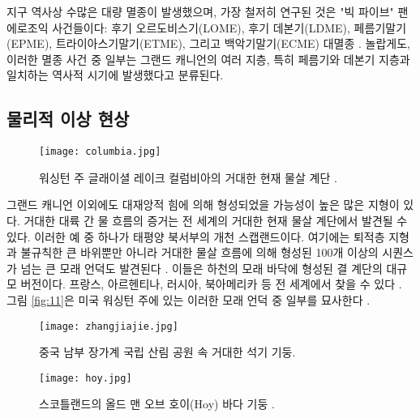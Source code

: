 \documentclass[10pt,twocolumn,letterpaper]{article}
\begin{document}
지구 역사상 수많은 대량 멸종이 발생했으며, 가장 철저히 연구된 것은 "빅 파이브" 팬에로조익 사건들이다: 후기 오르도비스기(LOME), 후기 데본기(LDME), 페름기말기(EPME), 트라이아스기말기(ETME), 그리고 백악기말기(ECME) 대멸종 \cite{88,89}. 놀랍게도, 이러한 멸종 사건 중 일부는 그랜드 캐니언의 여러 지층, 특히 페름기와 데본기 지층과 일치하는 역사적 시기에 발생했다고 분류된다.

\subsection{물리적 이상 현상}

\begin{figure}[t]
\begin{center}
   \texttt{[image: columbia.jpg]}
\end{center}
   \caption{워싱턴 주 글래이셜 레이크 컬럼비아의 거대한 현재 물살 계단 \cite{80}.}
\label{fig:11}
\label{fig:onecol}
\end{figure}

그랜드 캐니언 이외에도 대재앙적 힘에 의해 형성되었을 가능성이 높은 많은 지형이 있다. 거대한 대륙 간 물 흐름의 증거는 전 세계의 거대한 현재 물살 계단에서 발견될 수 있다. 이러한 예 중 하나가 태평양 북서부의 개천 스캡랜드이다. 여기에는 퇴적층 지형과 불규칙한 큰 바위뿐만 아니라 거대한 물살 흐름에 의해 형성된 100개 이상의 시퀀스가 넘는 큰 모래 언덕도 발견된다 \cite{78,79}. 이들은 하천의 모래 바닥에 형성된 결 계단의 대규모 버전이다. 프랑스, 아르헨티나, 러시아, 북아메리카 등 전 세계에서 찾을 수 있다 \cite{81}. 그림 \ref{fig:11}은 미국 워싱턴 주에 있는 이러한 모래 언덕 중 일부를 묘사한다 \cite{80}.

\begin{figure}[t]
\begin{center}
   \texttt{[image: zhangjiajie.jpg]}
\end{center}
   \caption{중국 남부 장가계 국립 산림 공원 속 거대한 석기 기둥.}
\label{fig:12}
\label{fig:onecol}
\end{figure}

\begin{figure}[t]
\begin{center}
   \texttt{[image: hoy.jpg]}
\end{center}
   \caption{스코틀랜드의 올드 맨 오브 호이(Hoy) 바다 기둥 \cite{83}.}
\label{fig:13}
\label{fig:onecol}
\end{figure}
\end{document}
